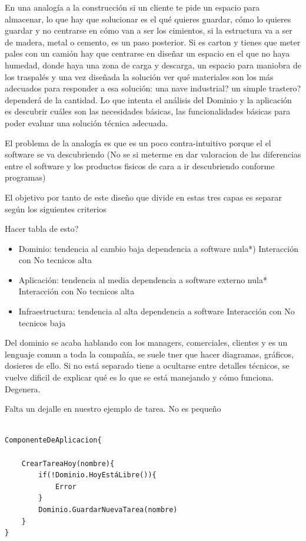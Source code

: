 En una analogía a la construcción si un cliente te pide un espacio para almacenar, lo que hay que solucionar es el qué quieres guardar, cómo lo quieres guardar y no centrarse en cómo van a ser los cimientos, si la estructura va a ser de madera, metal o cemento, es un paso posterior. Si es carton y tienes que meter pales con un camión hay que centrarse en diseñar un espacio en el que no haya humedad, donde haya una zona de carga y descarga, un espacio para maniobra de los traspalés y una vez diseñada la solución ver qué materiales son los más adecuados para responder a esa solución: una nave industrial? un simple trastero? dependerá de la cantidad. Lo que intenta el análisis del Dominio y la aplicación es descubrir cuáles son las necesidades básicas, las funcionalidades básicas para poder evaluar una solución técnica adecuada.

El problema de la analogía es que es un poco contra-intuitivo porque el el software se va descubriendo (No se si meterme en dar valoracion de las diferencias entre el software y los productos fisicos de cara a ir descubriendo conforme programas)

El objetivo por tanto de este diseño que divide en estas tres capas es separar según los siguientes criterios

Hacer tabla de esto?
\begin{itemize}
    \item Dominio:          tendencia al cambio baja    dependencia a software nula*)    Interacción con No tecnicos alta
    \item Aplicación:       tendencia al media          dependencia a software externo nula* Interacción con No tecnicos alta
    \item Infraestructura:  tendencia al alta           dependencia a software  Interacción con No tecnicos baja
\end{itemize}

Del dominio se acaba hablando con los managers, comerciales, clientes y es un lenguaje comun a toda la compañía, se suele tner que hacer diagramas, gráficos, dosieres de ello. Si no está separado tiene a ocultarse entre detalles técnicos, se vuelve dificil de explicar qué es lo que se está manejando y cómo funciona. Degenera.

Falta un dejalle en nuestro ejemplo de tarea. No es pequeño

\begin{verbatim}

ComponenteDeAplicacion{

    CrearTareaHoy(nombre){
        if(!Dominio.HoyEstáLibre()){
            Error
        }
        Dominio.GuardarNuevaTarea(nombre)
    }
}

\end{verbatim}


